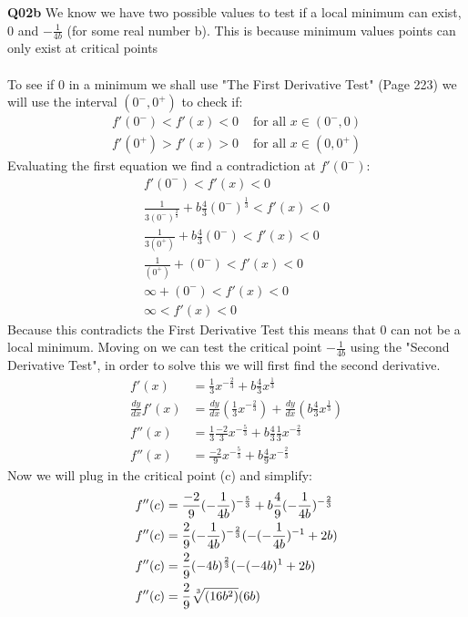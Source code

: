 \documentclass[11pt]{article}
\begin{document}
\textbf{Q02b} We know we have two possible values to test if a local minimum can exist, 0 and $-\frac{1}{4b}$ (for some real number b). This is because minimum values points can only exist at critical points\\\\
To see if 0 in a minimum we shall use "The First Derivative Test" (Page 223)  we will use the interval $(0^-,0^+)$ to check if:
\begin{align*}
f'(0^-)<f'(x) < 0 &\text{ for all $x \in (0^-,0)$} \\
f'(0^+)>f'(x) > 0 &\text{ for all $x \in (0,0^+)$}
\end{align*}
Evaluating the first equation we find a contradiction at $f'(0^-)$:
\begin{align*}
f'(0^-)< f'(x) < 0 \\
\frac{1}{3(0^-)^{\frac{2}{3}}} + b\frac{4}{3}(0^-)^{\frac{1}{3}}< f'(x) < 0 \\
\frac{1}{3(0^+)} + b\frac{4}{3}(0^-)< f'(x) < 0 \\
\frac{1}{(0^+)} + (0^-)< f'(x) < 0 \\
\infty + (0^-)< f'(x) < 0 \\
\infty < f'(x) < 0 
\end{align*}
Because this contradicts the First Derivative Test this means that 0 can not be a local minimum.
Moving on we can test the critical point $-\frac{1}{4b}$ using the "Second Derivative Test", in order to solve this we will first find the second derivative.
\begin{align*}
f'(x) & = \frac{1}{3}x^{-\frac{2}{3}} + b\frac{4}{3}x^{\frac{1}{3}}\\
\frac{dy}{dx}f'(x) & = \frac{dy}{dx}(\frac{1}{3}x^{-\frac{2}{3}}) + \frac{dy}{dx}(b\frac{4}{3}x^{\frac{1}{3}})\\
f''(x) & = \frac{1}{3}\frac{-2}{3}x^{-\frac{5}{3}} + b\frac{4}{3}\frac{1}{3}x^{-\frac{2}{3}}\\
f''(x) & = \frac{-2}{9}x^{-\frac{5}{3}} + b\frac{4}{9}x^{-\frac{2}{3}}
\end{align*}
Now we will plug in the critical point (c) and simplify:
\begin{align*}
f''(c) & = \frac{-2}{9}(-\frac{1}{4b})^{-\frac{5}{3}} + b\frac{4}{9}(-\frac{1}{4b})^{-\frac{2}{3}}\\
f''(c) & = \frac{2}{9}(-\frac{1}{4b})^{-\frac{2}{3}}(-(-\frac{1}{4b})^{-1}+2b) \\
f''(c) & = \frac{2}{9}(-4b)^{\frac{2}{3}}(-(-4b)^{1}+2b) \\
f''(c) & = \frac{2}{9}\sqrt[\leftroot{-2}\uproot{2}3]{(16b^2)}(6b) 
\end{align*}
\end{document}
